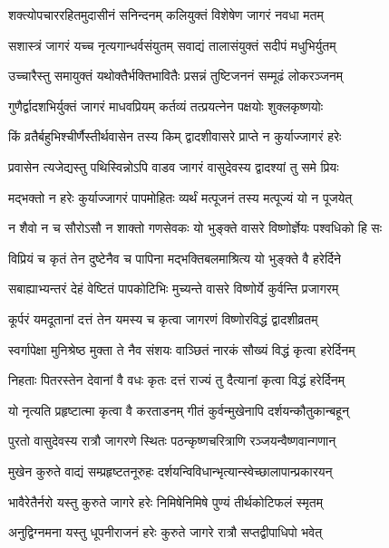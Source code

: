 \twolineshloka
{शक्त्योपचाररहितमुदासीनं सनिन्दनम्}
{कलियुक्तं विशेषेण जागरं नवधा मतम्}%

\twolineshloka
{सशास्त्रं जागरं यच्च नृत्यगान्धर्वसंयुतम्}
{सवाद्यं तालासंयुक्तं सदीपं मधुभिर्युतम्}%

\twolineshloka
{उच्चारैस्तु समायुक्तं यथोक्तैर्भक्तिभावितैः}
{प्रसन्नं तुष्टिजननं सम्मूढं लोकरञ्जनम्}%

\twolineshloka
{गुणैर्द्वादशभिर्युक्तं जागरं माधवप्रियम्}
{कर्तव्यं तत्प्रयत्नेन पक्षयोः शुक्लकृष्णयोः}%

\twolineshloka
{किं व्रतैर्बहुभिश्चीर्णैस्तीर्थवासेन तस्य किम्}
{द्वादशीवासरे प्राप्ते न कुर्याज्जागरं हरेः}%

\twolineshloka
{प्रवासेन त्यजेद्यस्तु पथिस्विन्नोऽपि वाडव}
{जागरं वासुदेवस्य द्वादश्यां तु समे प्रियः}%

\twolineshloka
{मद्भक्तो न हरेः कुर्याज्जागरं पापमोहितः}
{व्यर्थं मत्पूजनं तस्य मत्पूज्यं यो न पूजयेत्}%

\twolineshloka
{न शैवो न च सौरोऽसौ न शाक्तो गणसेवकः}
{यो भुङ्क्ते वासरे विष्णोर्ज्ञेयः पश्वधिको हि सः}%

\twolineshloka
{विप्रियं च कृतं तेन दुष्टेनैव च पापिना}
{मद्भक्तिबलमाश्रित्य यो भुङ्क्ते वै हरेर्दिने}%

\twolineshloka
{सबाह्याभ्यन्तरं देहं वेष्टितं पापकोटिभिः}
{मुच्यन्ते वासरे विष्णोर्ये कुर्वन्ति प्रजागरम्}%

\twolineshloka
{कूर्परं यमदूतानां दत्तं तेन यमस्य च}
{कृत्वा जागरणं विष्णोरविद्धं द्वादशीव्रतम्}%

\twolineshloka
{स्वर्गापेक्षा मुनिश्रेष्ठ मुक्ता ते नैव संशयः}
{वाञ्छितं नारकं सौख्यं विद्धं कृत्वा हरेर्दिनम्}%

\twolineshloka
{निहताः पितरस्तेन देवानां वै वधः कृतः}
{दत्तं राज्यं तु दैत्यानां कृत्वा विद्धं हरेर्दिनम्}%

\twolineshloka
{यो नृत्यति प्रहृष्टात्मा कृत्वा वै करताडनम्}
{गीतं कुर्वन्मुखेनापि दर्शयन्कौतुकान्बहून्}%

\twolineshloka
{पुरतो वासुदेवस्य रात्रौ जागरणे स्थितः}
{पठन्कृष्णचरित्राणि रञ्जयन्वैष्णवान्गणान्}%

\twolineshloka
{मुखेन कुरुते वाद्यं सम्प्रहृष्टतनूरुहः}
{दर्शयन्विविधान्भृत्यान्स्वेच्छालापान्प्रकारयन्}%

\twolineshloka
{भावैरेतैर्नरो यस्तु कुरुते जागरे हरेः}
{निमिषेनिमिषे पुण्यं तीर्थकोटिफलं स्मृतम्}%

\twolineshloka
{अनुद्विग्नमना यस्तु धूपनीराजनं हरेः}
{कुरुते जागरे रात्रौ सप्तद्वीपाधिपो भवेत्}%

